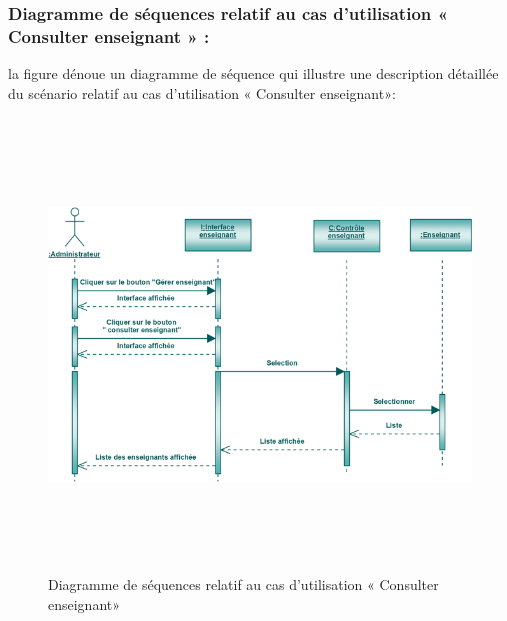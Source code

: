 \documentclass[12 pt ]{report}
\begin{document}
\subsubsection{Diagramme de séquences relatif au cas d’utilisation « Consulter enseignant » :}
la figure   dénoue un diagramme de séquence qui illustre une description détaillée du scénario relatif au cas d’utilisation «  Consulter enseignant»: 
{\begin{figure}[h]
 \begin{center}
\includegraphics[width= 17 cm ,height=  12cm]{sec_cons_ens.PNG}
\caption{Diagramme de séquences relatif au cas d’utilisation « Consulter enseignant»}

\end{center}
\end{figure}}
\newpage
\end{document}
